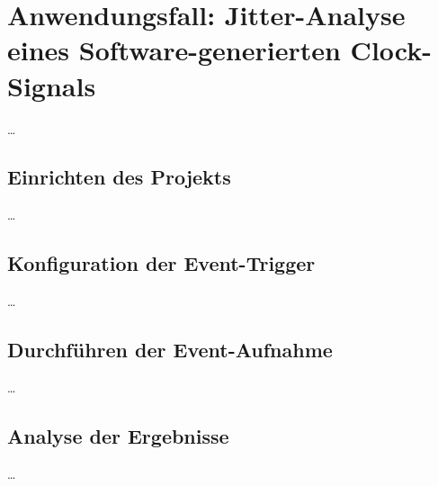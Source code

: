 \chapter{Anwendungsfall: Jitter-Analyse eines Software-generierten Clock-Signals}
\label{ch:Anwendungfsfall}
\ldots

\section{Einrichten des Projekts}
\label{ch:Anwendungsfall:sec:Einrichten}

\ldots


\section{Konfiguration der Event-Trigger}
\label{ch:Anwendungsfall:sec:Event-Trigger}

\ldots


\section{Durchf\"uhren der Event-Aufnahme}
\label{ch:Anwendungsfall:sec:Durchf\"uhrung}

\ldots


\section{Analyse der Ergebnisse}
\label{ch:Anwendungsfall:sec:Analyse}

\ldots


